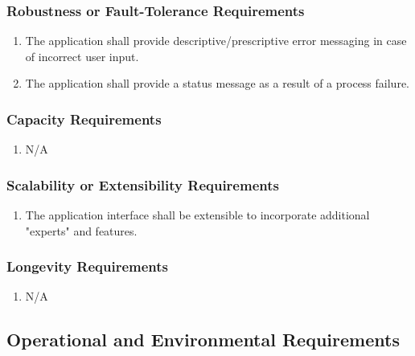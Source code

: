 \documentclass[]{article}
\begin{document}
\subsubsection{Robustness or Fault-Tolerance Requirements}
\label{ssub:robustness_or_fault_tolerance_requirements}
\begin{enumerate}[{PR}1. ]
	\item The application shall provide descriptive/prescriptive error messaging in case of incorrect user input.
	\item The application shall provide a status message as a result of a process failure.

\end{enumerate}

\subsubsection{Capacity Requirements}
\label{ssub:capacity_requirements}
\begin{enumerate}[{PR}1. ]
	\item N/A
\end{enumerate}

\subsubsection{Scalability or Extensibility Requirements}
\label{ssub:scalability_or_extensibility_requirements}
\begin{enumerate}[{PR}1. ]
	\item The application interface shall be extensible to incorporate additional "experts" and features.
\end{enumerate}

\subsubsection{Longevity Requirements}
\label{ssub:longevity_requirements}
\begin{enumerate}[{PR}1. ]
	\item N/A
\end{enumerate}


\subsection{Operational and Environmental Requirements}
\label{sub:operational_and_environmental_requirements}
\end{document}
